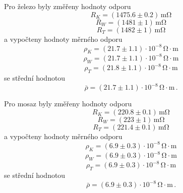 \documentclass{../concepts/prepareprotokol} %
\begin{document}
Pro železo byly změřeny hodnoty odporu
\begin{equation*}
    R_K = (1475.6 \pm 0.2) \, \si{\milli\ohm}
\end{equation*}
\begin{equation*}
    R_W = (1481 \pm 1) \, \si{\milli\ohm}
\end{equation*}
\begin{equation*}
    R_T = (1482 \pm 1) \, \si{\milli\ohm}
\end{equation*}
a vypočteny hodnoty měrného odporu
\begin{equation*}
    \rho_K = (21.7 \pm 1.1) \cdot 10^{-8} \, \mathrm{\Omega \cdot m}
\end{equation*}
\begin{equation*}
    \rho_W = (21.7 \pm 1.1) \cdot 10^{-8} \, \mathrm{\Omega \cdot m}
\end{equation*}
\begin{equation*}
    \rho_T = (21.8 \pm 1.1) \cdot 10^{-8} \, \mathrm{\Omega \cdot m}
\end{equation*}
se střední hodnotou
\begin{equation*}
    \bar{\rho} = (21.7 \pm 1.1) \cdot 10^{-8} \, \mathrm{\Omega \cdot m} \, .
\end{equation*}

Pro mosaz byly změřeny hodnoty odporu
\begin{equation*}
    R_K = (220.8 \pm 0.1) \, \si{\milli\ohm}
\end{equation*}
\begin{equation*}
    R_W = (223 \pm 1) \, \si{\milli\ohm}
\end{equation*}
\begin{equation*}
    R_T = (221.4 \pm 0.1) \, \si{\milli\ohm}
\end{equation*}
a vypočteny hodnoty měrného odporu
\begin{equation*}
    \rho_K = (6.9 \pm 0.3) \cdot 10^{-8} \, \mathrm{\Omega \cdot m}
\end{equation*}
\begin{equation*}
    \rho_W = (6.9 \pm 0.3) \cdot 10^{-8} \, \mathrm{\Omega \cdot m}
\end{equation*}
\begin{equation*}
    \rho_T = (6.9 \pm 0.3) \cdot 10^{-8} \, \mathrm{\Omega \cdot m}
\end{equation*}
se střední hodnotou
\begin{equation*}
    \bar{\rho} = (6.9 \pm 0.3) \cdot 10^{-8} \, \mathrm{\Omega \cdot m} \, .
\end{equation*}
\end{document}
